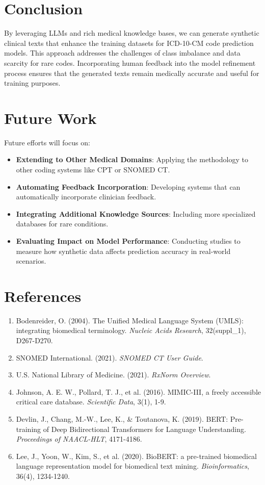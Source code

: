 \documentclass[12pt, a4paper]{article}
\begin{document}
\section{Conclusion}

By leveraging LLMs and rich medical knowledge bases, we can generate synthetic clinical texts that enhance the training datasets for ICD-10-CM code prediction models. This approach addresses the challenges of class imbalance and data scarcity for rare codes. Incorporating human feedback into the model refinement process ensures that the generated texts remain medically accurate and useful for training purposes.

\section{Future Work}

Future efforts will focus on:

\begin{itemize}
    \item \textbf{Extending to Other Medical Domains}: Applying the methodology to other coding systems like CPT or SNOMED CT.
    \item \textbf{Automating Feedback Incorporation}: Developing systems that can automatically incorporate clinician feedback.
    \item \textbf{Integrating Additional Knowledge Sources}: Including more specialized databases for rare conditions.
    \item \textbf{Evaluating Impact on Model Performance}: Conducting studies to measure how synthetic data affects prediction accuracy in real-world scenarios.
\end{itemize}

\section*{References}

\begin{enumerate}
    \item Bodenreider, O. (2004). The Unified Medical Language System (UMLS): integrating biomedical terminology. \textit{Nucleic Acids Research}, 32(suppl\_1), D267-D270.
    \item SNOMED International. (2021). \textit{SNOMED CT User Guide}.
    \item U.S. National Library of Medicine. (2021). \textit{RxNorm Overview}.
    \item Johnson, A. E. W., Pollard, T. J., et al. (2016). MIMIC-III, a freely accessible critical care database. \textit{Scientific Data}, 3(1), 1-9.
    \item Devlin, J., Chang, M.-W., Lee, K., \& Toutanova, K. (2019). BERT: Pre-training of Deep Bidirectional Transformers for Language Understanding. \textit{Proceedings of NAACL-HLT}, 4171-4186.
    \item Lee, J., Yoon, W., Kim, S., et al. (2020). BioBERT: a pre-trained biomedical language representation model for biomedical text mining. \textit{Bioinformatics}, 36(4), 1234-1240.
\end{enumerate}
\end{document}
